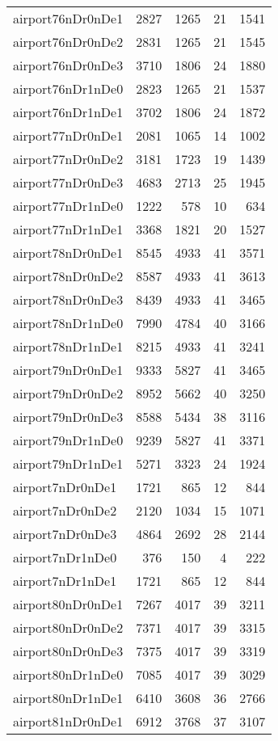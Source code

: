 \begin{longtable}{lrrrr}
airport76nDr0nDe1 & 2827 & 1265 & 21 & 1541 \\
airport76nDr0nDe2 & 2831 & 1265 & 21 & 1545 \\
airport76nDr0nDe3 & 3710 & 1806 & 24 & 1880 \\
airport76nDr1nDe0 & 2823 & 1265 & 21 & 1537 \\
airport76nDr1nDe1 & 3702 & 1806 & 24 & 1872 \\
airport77nDr0nDe1 & 2081 & 1065 & 14 & 1002 \\
airport77nDr0nDe2 & 3181 & 1723 & 19 & 1439 \\
airport77nDr0nDe3 & 4683 & 2713 & 25 & 1945 \\
airport77nDr1nDe0 & 1222 & 578 & 10 & 634 \\
airport77nDr1nDe1 & 3368 & 1821 & 20 & 1527 \\
airport78nDr0nDe1 & 8545 & 4933 & 41 & 3571 \\
airport78nDr0nDe2 & 8587 & 4933 & 41 & 3613 \\
airport78nDr0nDe3 & 8439 & 4933 & 41 & 3465 \\
airport78nDr1nDe0 & 7990 & 4784 & 40 & 3166 \\
airport78nDr1nDe1 & 8215 & 4933 & 41 & 3241 \\
airport79nDr0nDe1 & 9333 & 5827 & 41 & 3465 \\
airport79nDr0nDe2 & 8952 & 5662 & 40 & 3250 \\
airport79nDr0nDe3 & 8588 & 5434 & 38 & 3116 \\
airport79nDr1nDe0 & 9239 & 5827 & 41 & 3371 \\
airport79nDr1nDe1 & 5271 & 3323 & 24 & 1924 \\
airport7nDr0nDe1 & 1721 & 865 & 12 & 844 \\
airport7nDr0nDe2 & 2120 & 1034 & 15 & 1071 \\
airport7nDr0nDe3 & 4864 & 2692 & 28 & 2144 \\
airport7nDr1nDe0 & 376 & 150 & 4 & 222 \\
airport7nDr1nDe1 & 1721 & 865 & 12 & 844 \\
airport80nDr0nDe1 & 7267 & 4017 & 39 & 3211 \\
airport80nDr0nDe2 & 7371 & 4017 & 39 & 3315 \\
airport80nDr0nDe3 & 7375 & 4017 & 39 & 3319 \\
airport80nDr1nDe0 & 7085 & 4017 & 39 & 3029 \\
airport80nDr1nDe1 & 6410 & 3608 & 36 & 2766 \\
airport81nDr0nDe1 & 6912 & 3768 & 37 & 3107 \\

\end{longtable}
